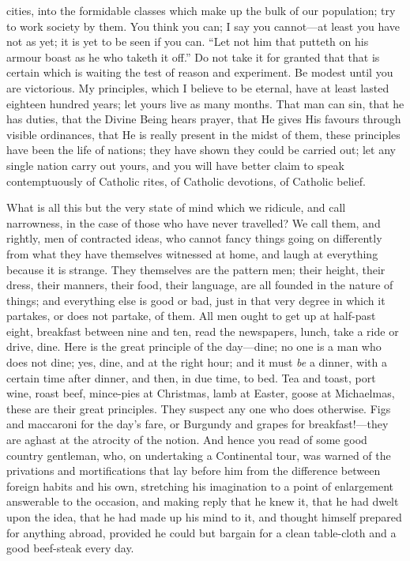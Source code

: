 cities, into the formidable classes which make up the
bulk of our population; try to work society by them. You
think you can; I say you cannot—at least you have
not as yet; it is yet to be seen if you can. ``Let
not him that putteth on his armour boast as he who taketh
it off.'' Do not take it for granted that that is
certain which is waiting the test of reason and
experiment. Be modest until you are victorious. My
principles, which I believe to be eternal, have at least
lasted eighteen hundred years; let yours live as many
months. That man can sin, that he has duties, that the
Divine Being hears prayer, that He gives His favours
through visible ordinances, that He is really present in
the midst of them, these principles have been the life of
nations; they have shown they could be carried out; let
any single nation carry out yours, and you will have
better claim to speak contemptuously of Catholic rites,
of Catholic devotions, of Catholic belief.

What is all this but the very state of mind which we
ridicule, and call narrowness, in the case of those who
have never travelled? We call them, and rightly, men of
contracted ideas, who cannot fancy things going on
differently from what they have themselves witnessed at
home, and laugh at everything because it is strange. They
themselves are the pattern men; their height, their
dress, their manners, their food, their language, are all
founded in the nature of things; and everything else is
good or bad, just in that very degree in which it
partakes, or does not partake, of them. All men ought to
get up at half-past eight, breakfast between nine and
ten, read the newspapers, lunch, take a ride or drive,
dine. Here is the great principle of the day—dine;
no one is a man who does not dine; yes, dine, and at the
right hour; and it must \emph{be} a dinner, with a
certain time after dinner, and then, in due time, to bed.
Tea and toast, port wine, roast beef, mince-pies at
Christmas, lamb at Easter, goose at Michaelmas, these are
their great principles. They suspect any one who does
otherwise. Figs and maccaroni for the day's fare, or
Burgundy and grapes for breakfast!—they are aghast
at the atrocity of the notion. And hence you read of some
good country gentleman, who, on undertaking a Continental
tour, was warned of the privations and mortifications
that lay before him from the difference between foreign
habits and his own, stretching his imagination to a point
of enlargement answerable to the occasion, and making
reply that he knew it, that he had dwelt upon the idea,
that he had made up his mind to it, and thought himself
prepared for anything abroad, provided he could but
bargain for a clean table-cloth and a good beef-steak
every day.

